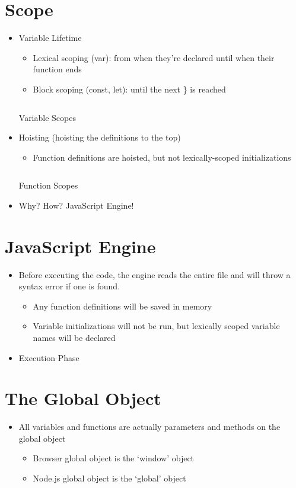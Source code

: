 \section{Scope}
\begin{itemize}
	\item Variable Lifetime
	      \begin{itemize}
		      \item Lexical scoping (var): from when they're declared until when
		            their function ends
		      \item Block scoping (const, let): until the next \} is reached
	      \end{itemize}
	      \begin{code}
		      \inputminted{js}{src0/4-scopeVariables.js}
		      \caption{Variable Scopes}
	      \end{code}
	\item Hoisting (hoisting the definitions to the top)
	      \begin{itemize}
		      \item Function definitions are hoisted, but not lexically-scoped
		            initializations
	      \end{itemize}
	      \begin{code}
		      \inputminted{js}{src0/5-scopeFunctions.js}
		      \caption{Function Scopes}
	      \end{code}
	\item Why? How? JavaScript Engine!
\end{itemize}

\section{JavaScript Engine}
\begin{itemize}
	\item Before executing the code, the engine reads the entire file and
	      will throw a syntax error if one is found.
	      \begin{itemize}
		      \item Any function definitions will be saved in memory
		      \item Variable initializations will not be run, but lexically
		            scoped variable names will be declared
	      \end{itemize}
	\item Execution Phase
\end{itemize}

\section{The Global Object}
\begin{itemize}
	\item All variables and functions are actually parameters and methods
	      on the global object
	      \begin{itemize}
		      \item Browser global object is the `window' object
		      \item Node.js global object is the `global' object
	      \end{itemize}
\end{itemize}

